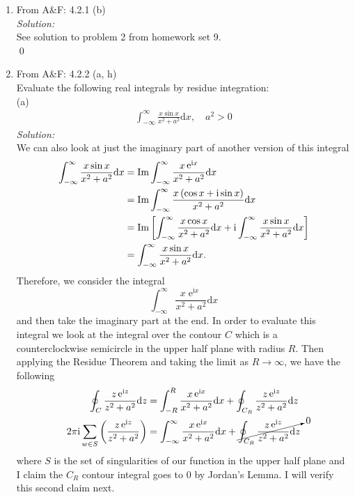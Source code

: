 \documentclass[10pt]{amsart}
\newcommand{\D}{\mathrm{d}}
\newcommand{\I}{\mathrm{i}}
\DeclareMathOperator{\E}{e}
\theoremstyle{nonumberplain}
\begin{document}
\begin{enumerate}[label={\bf {\arabic*}:}]
\item From A\&F: 4.2.1 (b) \\
 
\noindent
\textit{Solution:} \\
See solution to problem 2 from homework set 9. \\
\qed \\


\item From A\&F: 4.2.2 (a, h) \\
Evaluate the following real integrals by residue integration: \\
 
\noindent
(a) \\
\begin{align*}
\int_{-\infty}^{\infty} \frac {x \sin x}{x^2 + a^2 } \D x, \quad a^2 > 0
\end{align*}
\textit{Solution:} \\
We can also look at just the imaginary part of another version of this integral
\begin{align*}
\int_{-\infty}^{\infty} \frac {x \sin x}{x^2 + a^2 } \D x
	&= { \rm Im } \int_{-\infty}^{\infty} \frac {x \E^{\I x}}{x^2 + a^2 } \D x \\
	&= { \rm Im } \int_{-\infty}^{\infty} \frac {x \left( \cos x + \I \sin x \right)}{x^2 + a^2 } \D x \\
	&= { \rm Im } \left[
		\int_{-\infty}^{\infty} \frac {x \cos x }{x^2 + a^2 } \D x
		+ \I \int_{-\infty}^{\infty} \frac {x \sin x }{x^2 + a^2 } \D x
	\right] \\
	&= \int_{-\infty}^{\infty} \frac {x \sin x}{x^2 + a^2 } \D x.
\end{align*}
Therefore, we consider the integral 
$$
\int_{-\infty}^{\infty} \frac {x \E^{\I x}}{x^2 + a^2 } \D x
$$
and then take the imaginary part at the end.
In order to evaluate this integral we look at the integral over the contour $C$ which is a counterclockwise semicircle in the upper half plane with radius $R$.
Then applying the Residue Theorem and taking the limit as $R \rightarrow \infty$, we have the following
\begin{align*}
\oint_{C} \frac {z \E^{\I z}}{z^2 + a^2 } \D z
	&= \int_{-R}^{R} \frac {x \E^{\I x}}{x^2 + a^2 } \D x + \oint_{C_R} \frac {z \E^{\I z}}{z^2 + a^2 } \D z \\
2 \pi \I\sum_{w \in S} \left( \frac {z \E^{\I z}}{z^2 + a^2 } \right)
	&= \int_{-\infty}^{\infty} \frac {x \E^{\I x}}{x^2 + a^2 } \D x + \cancelto{0}{\oint_{C_R} \frac {z \E^{\I z}}{z^2 + a^2 } \D z}
\end{align*}
where $S$ is the set of singularities of our function in the upper half plane and I claim the $C_R$ contour integral goes to 0 by Jordan's Lemma.
I will verify this second claim next.\\


\end{enumerate}
\end{document}
